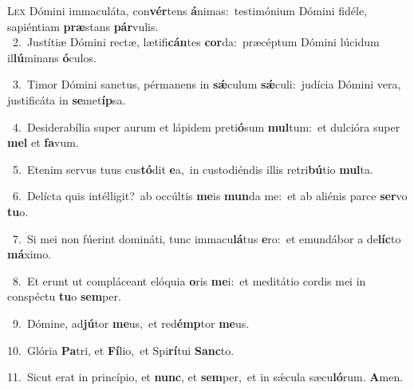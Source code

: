 \lettrine{\initial\textcolor{\initialcolor}{L}}{ex} Dómini immaculáta, con\-\textbf{vér}\-tens \textbf{á}\-nimas:~\star testimónium Dómini fidéle, sapiéntiam \textbf{præ}\-stans \textbf{pár}\-vulis.\\
{\numbfont\textcolor{\numbcolor}{~2.}}~Justítiæ Dómini rectæ, lætifi\-\textbf{cán}\-tes \textbf{cor}\-da:~\star præcéptum Dómini lúcidum il\-\textbf{lú}\-minans \textbf{ó}\-culos.\par
{\numbfont\textcolor{\numbcolor}{~3.}}~Timor Dómini sanctus, pérmanens in \textbf{sǽ}\-culum \textbf{sǽ}\-culi:~\star judícia Dómini vera, justificáta in \textbf{se}\-met\-\textbf{íp}\-sa.\par
{\numbfont\textcolor{\numbcolor}{~4.}}~Desiderabília super aurum et lápidem preti\-\textbf{ó}\-sum \textbf{mul}\-tum:~\star et dulcióra super \textbf{mel} et \textbf{fa}\-vum.\par
{\numbfont\textcolor{\numbcolor}{~5.}}~Etenim servus tuus cus\-\textbf{tó}\-dit \textbf{e}\-a,~\star in custodiéndis illis retri\-\textbf{bú}\-tio \textbf{mul}\-ta.\par
{\numbfont\textcolor{\numbcolor}{~6.}}~Delícta quis intélligit?~\dagger ab occúltis \textbf{me}\-is \textbf{mun}\-da me:~\star et ab aliénis parce \textbf{ser}\-vo \textbf{tu}\-o.\par
{\numbfont\textcolor{\numbcolor}{~7.}}~Si mei non fúerint domináti, tunc immacu\-\textbf{lá}\-tus \textbf{e}\-ro:~\star et emundábor a de\-\textbf{líc}\-to \textbf{má}\-ximo.\par
{\numbfont\textcolor{\numbcolor}{~8.}}~Et erunt ut compláceant elóquia \textbf{o}\-ris \textbf{me}\-i:~\star et meditátio cordis mei in conspéctu \textbf{tu}\-o \textbf{sem}\-per.\par
{\numbfont\textcolor{\numbcolor}{~9.}}~Dómine, ad\-\textbf{jú}\-tor \textbf{me}\-us,~\star et red\-\textbf{émp}\-tor \textbf{me}\-us.\par
{\numbfont\textcolor{\numbcolor}{10.}}~Glória \textbf{Pa}\-tri, et \textbf{Fí}\-lio,~\star et Spi\-\textbf{rí}\-tui \textbf{Sanc}\-to.\par
{\numbfont\textcolor{\numbcolor}{11.}}~Sicut erat in princípio, et \textbf{nunc}\-, et \textbf{sem}\-per,~\star et in sǽcula sæcu\-\textbf{ló}\-rum. \textbf{A}\-men.\par
